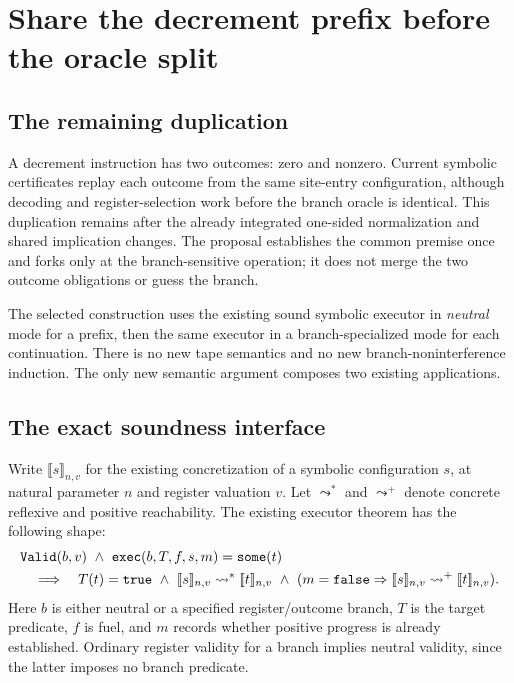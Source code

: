 \section{Share the decrement prefix before the oracle split}
\label{sec:prefix}
\subsection{The remaining duplication}
A decrement instruction has two outcomes: zero and nonzero. Current symbolic certificates replay each outcome from the same site-entry configuration, although decoding and register-selection work before the branch oracle is identical. This duplication remains after the already integrated one-sided normalization and shared implication changes. The proposal establishes the common premise once and forks only at the branch-sensitive operation; it does not merge the two outcome obligations or guess the branch.

The selected construction uses the existing sound symbolic executor in \emph{neutral} mode for a prefix, then the same executor in a branch-specialized mode for each continuation. There is no new tape semantics and no new branch-noninterference induction. The only new semantic argument composes two existing  applications.

\subsection{The exact soundness interface}
Write $\llbracket s\rrbracket_{n,v}$ for the existing concretization of a symbolic configuration $s$, at natural parameter $n$ and register valuation $v$. Let $\leadsto^*$ and $\leadsto^+$ denote concrete reflexive and positive reachability. The existing executor theorem has the following shape:
\[
\begin{split}
 &\code{Valid}(b,v)\ \wedge\
 \code{exec}(b,T,f,s,m)=\code{some}(t)\\
 &\quad\Longrightarrow\quad
 T(t)=\code{true}\ \wedge\
 \llbracket s\rrbracket_{n,v}\leadsto^*\llbracket t\rrbracket_{n,v}\
 \wedge\
 (m=\code{false}\Rightarrow
 \llbracket s\rrbracket_{n,v}\leadsto^+\llbracket t\rrbracket_{n,v}).
\end{split}
\]
Here $b$ is either neutral or a specified register/outcome branch, $T$ is the target predicate, $f$ is fuel, and $m$ records whether positive progress is already established. Ordinary register validity for a branch implies neutral validity, since the latter imposes no branch predicate.

